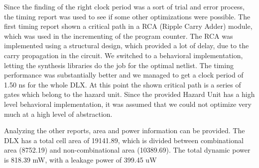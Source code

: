 Since the finding of the right clock period was a sort of trial and error process, the timing report was used to see if some other optimizations were possible.
The first timing report shown a critical path in a RCA (Ripple Carry Adder) module, which was used in the incrementing of the program counter.
The RCA was implemented using a structural design, which provided a lot of delay, due to the carry propagation in the circuit.
We switched to a behavioral implementation, letting the synthesis libraries do the job for the optimal netlist. The timing performance was substantially better and we managed
to get a clock period of 1.50 ns for the whole DLX.
At this point the shown critical path is a series of gates which belong to the hazard unit. Since the provided Hazard Unit has a high level behavioral implementation, it was assumed that we could not
optimize very much at a high level of abstraction.

Analyzing the other reports, area and power information can be provided.
The DLX has a total cell area of 19141.89, which is divided between combinational area (8752.19) and non-combinational area (10389.69).
The total dynamic power is 818.39 mW, with a leakage power of 399.45 uW
